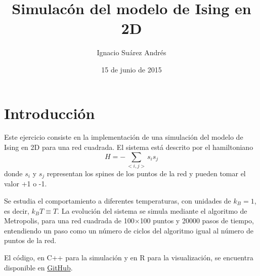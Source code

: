 \documentclass{scrartcl}
\title{Simulacón del modelo de Ising en 2D}
\author{Ignacio Suárez Andrés}
\date{15 de junio de 2015}
\begin{document}
\maketitle
\section{Introducción}
Este ejercicio consiste en la implementación de una simulación del modelo de Ising en 2D para una red cuadrada. El sistema está descrito por el hamiltoniano
\begin{equation}
H=-\sum_{<i,j>} s_i s_j
\end{equation}
donde $s_i$ y $s_j$ representan los spines de los puntos de la red y pueden tomar el valor +1 o -1.\par
Se estudia el comportamiento a diferentes temperaturas, con unidades de $k_B=1$, es decir, $k_BT\equiv T$. La evolución del sistema se simula mediante el algoritmo de Metropolis, para una red cuadrada de 100$\times$100 puntos y 20000 pasos de tiempo, entendiendo un paso como un número de ciclos del algoritmo igual al número de puntos de la red.\par
El código, en C++ para la simulación y en R para la visualización, se encuentra disponible en \href{https://github.com/nachosandres/Ising2D}{GitHub}.
\end{document}
